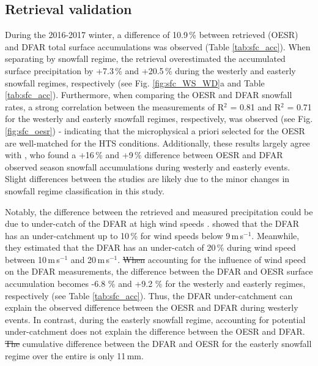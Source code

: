 \documentclass{ametsocV5}
\providecommand{\DIFadd}[1]{{\protect\color{blue}\uwave{#1}}} %
\providecommand{\DIFdel}[1]{{\protect\color{red}\sout{#1}}}                      %
\providecommand{\DIFaddbegin}{} %
\providecommand{\DIFaddend}{} %
\providecommand{\DIFdelbegin}{} %
\providecommand{\DIFdelend}{} %
\newcommand{\DIFscaledelfig}{0.5}
\newlength{\DIFdelgraphicswidth} %
\newlength{\DIFdelgraphicsheight} %
\newcommand{\DIFaddincludegraphics}[2][]{{\color{blue}\fbox{\DIFOincludegraphics[#1]{#2}}}} %
\newcommand{\DIFdelincludegraphics}[2][]{%
\sbox{\DIFdelgraphicsbox}{\DIFOincludegraphics[#1]{#2}}%
\settoboxwidth{\DIFdelgraphicswidth}{\DIFdelgraphicsbox} %
\settoboxtotalheight{\DIFdelgraphicsheight}{\DIFdelgraphicsbox} %
\scalebox{\DIFscaledelfig}{%
\parbox[b]{\DIFdelgraphicswidth}{\usebox{\DIFdelgraphicsbox}\\[-\baselineskip] \rule{\DIFdelgraphicswidth}{0em}}\llap{\resizebox{\DIFdelgraphicswidth}{\DIFdelgraphicsheight}{%
\setlength{\unitlength}{\DIFdelgraphicswidth}%
\begin{picture}(1,1)%
\thicklines\linethickness{2pt} %
{\color[rgb]{1,0,0}\put(0,0){\framebox(1,1){}}}%
{\color[rgb]{1,0,0}\put(0,0){\line( 1,1){1}}}%
{\color[rgb]{1,0,0}\put(0,1){\line(1,-1){1}}}%
\end{picture}%
}\hspace*{3pt}}} %
} %
\DeclareRobustCommand{\DIFaddbegin}{\DIFOaddbegin \let\includegraphics\DIFaddincludegraphics} %
\DeclareRobustCommand{\DIFaddend}{\DIFOaddend \let\includegraphics\DIFOincludegraphics} %
\DeclareRobustCommand{\DIFdelbegin}{\DIFOdelbegin \let\includegraphics\DIFdelincludegraphics} %
\DeclareRobustCommand{\DIFdelend}{\DIFOaddend \let\includegraphics\DIFOincludegraphics} %
\begin{document}
	\subsection{Retrieval validation}
		During the 2016-2017 winter, a difference of 10.9\,\% between retrieved (OESR) and DFAR total surface accumulations was observed (Table \ref{tab:sfc_acc}). When separating by snowfall regime, the retrieval overestimated the accumulated surface precipitation by +7.3\,\% and +20.5\,\% during the westerly and easterly snowfall regimes, respectively (see Fig. \ref{fig:sfc_WS_WD}a and Table \ref{tab:sfc_acc}). Furthermore, when comparing the OESR and DFAR snowfall rates,  a strong correlation between the measurements of R$^2$ = 0.81 and R$^2$ = 0.71 for the westerly and easterly snowfall regimes, respectively, was observed (see Fig. \ref{fig:sfc_oesr}) - indicating that the microphysical a priori selected for the OESR are well-matched for the HTS conditions. Additionally, these results largely agree with \citet{schirle_estimation_2019}, who found a +16\,\% and +9\,\% difference between OESR and DFAR observed season snowfall accumulations during westerly and easterly events. Slight differences between the studies are likely due to the minor changes in snowfall regime classification in this study.

		Notably, the difference between the retrieved and measured precipitation could be due to \DIFaddbegin \DIFadd{the }\DIFaddend under-catch of the DFAR at high wind speeds \citep{theriault_impact_2015,nitu_iom_2018,colli_adjustments_2020}. \citet{nitu_iom_2018} showed that the DFAR has an under-catchment up to 10\,\% for wind speeds below 9\,m\,s$^{-1}$. Meanwhile, they estimated that the DFAR has an under-catch of 20\,\% during wind speed between 10\,m\,s$^{-1}$ and 20\,m\,s$^{-1}$. \DIFdelbegin \DIFdel{When }\DIFdelend \DIFaddbegin \DIFadd{Thus, when }\DIFaddend accounting for the influence of wind speed on the DFAR measurements, the difference between the DFAR and OESR surface accumulation becomes -6.8 \% and +9.2 \% for the westerly and easterly regimes, respectively (see Table \ref{tab:sfc_acc}). Thus, the DFAR under-catchment can explain the observed difference between the OESR and DFAR during westerly events. In contrast, during the easterly snowfall regime, accounting for potential under-catchment does not explain the difference between the OESR and DFAR. \DIFdelbegin \DIFdel{The }\DIFdelend \DIFaddbegin \DIFadd{As a result, the }\DIFaddend cumulative difference between the DFAR and OESR for the easterly snowfall regime over the entire \DIFaddbegin \DIFadd{season }\DIFaddend is only 11\,mm. 
\end{document}
